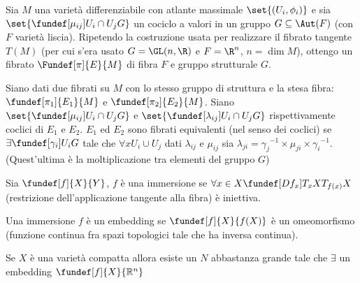 
\newcommand*\dual{{^\ast}} %
\newcommand*\base[1][B]{\mathcal{#1}} %


Sia $M$ una varietà differenziabile con atlante massimale $\set{(U_i, \phi_i)}$ e sia $\set{ \fundef[\mu_{ij}]{U_i \cap U_j}{G} }$ un cociclo a valori in un gruppo $G \subseteq \Aut(F)$ (con $F$ varietà liscia). Ripetendo la costruzione usata per realizzare il fibrato tangente $T(M)$ (per cui s'era usato $G = \GL(n, \R)$ e $F=\R^n$, $n = \dim M$), ottengo un fibrato $\Fundef[\pi]{E}{M}$ di fibra $F$ e gruppo strutturale $G$.

\begin{defn}
Siano dati due fibrati su $M$ con lo stesso gruppo di struttura e la stesa fibra: $\fundef[\pi_1]{E_1}{M}$ e  $\fundef[\pi_2]{E_2}{M}$.
Siano $\set{ \fundef[\mu_{ij}]{U_i \cap U_j}{G} }$ e $\set{ \fundef[\lambda_{ij}]{U_i \cap U_j}{G} }$ rispettivamente coclici di $E_1$ e $E_2$.
$E_1$ ed $E_2$ sono fibrati equivalenti (nel senso dei coclici) se $\exists \fundef[\gamma_{i}]{U_i}{G}$ tale che $\forall x U_i \cup U_j$ dati $\lambda_{ij}$ e $\mu_{ij}$
sia $\lambda_{ji} = {\gamma_j}^{-1} \times \mu_{ji} \times  {\gamma_i}^{-1}$.  (Quest'ultima è la moltiplicazione tra elementi del gruppo $G$)
\end{defn}

\begin{defn}
Sia $\fundef[f]{X}{Y}$, $f$ è una immersione se $\forall x \in X \fundef[Df_{x}]{T_{x}X}{T_{f(x)} X}$ (restrizione dell'applicazione tangente alla fibra) è iniettiva.
\end{defn}

\begin{defn}[Embedding] 
 Una immersione $f$ è un embedding se $\fundef[f]{X}{f(X)}$  è un omeomorfismo (funzione continua fra spazi topologici tale che ha inversa continua).
\end{defn}



\begin{teo}
 Se $X$ è una varietà compatta allora esiste un $N$ abbastanza grande tale che $\exists$ un embedding $\fundef[f]{X}{\mathbb{R}^{n}}$
\end{teo}


